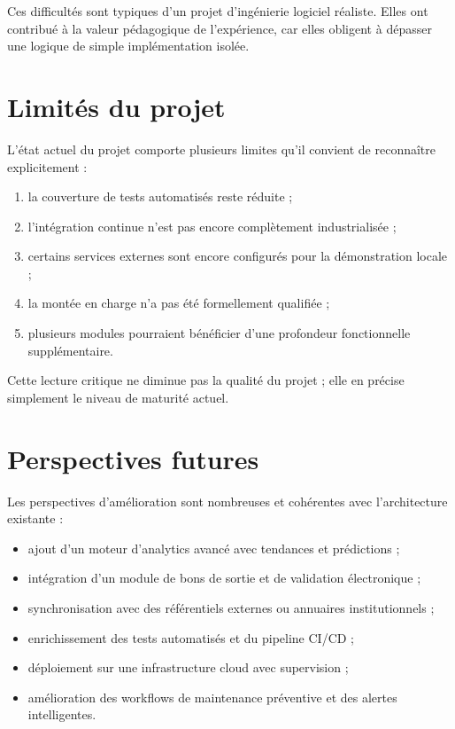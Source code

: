 Ces difficultés sont typiques d'un projet d'ingénierie logiciel réaliste. Elles ont contribué à la valeur pédagogique de l'expérience, car elles obligent à dépasser une logique de simple implémentation isolée.

\section{Limités du projet}
L'état actuel du projet comporte plusieurs limites qu'il convient de reconnaître explicitement :
\begin{enumerate}
  \item la couverture de tests automatisés reste réduite ;
  \item l'intégration continue n'est pas encore complètement industrialisée ;
  \item certains services externes sont encore configurés pour la démonstration locale ;
  \item la montée en charge n'a pas été formellement qualifiée ;
  \item plusieurs modules pourraient bénéficier d'une profondeur fonctionnelle supplémentaire.
\end{enumerate}

Cette lecture critique ne diminue pas la qualité du projet ; elle en précise simplement le niveau de maturité actuel.

\section{Perspectives futures}
Les perspectives d'amélioration sont nombreuses et cohérentes avec l'architecture existante :
\begin{itemize}
  \item ajout d'un moteur d'analytics avancé avec tendances et prédictions ;
  \item intégration d'un module de bons de sortie et de validation électronique ;
  \item synchronisation avec des référentiels externes ou annuaires institutionnels ;
  \item enrichissement des tests automatisés et du pipeline CI/CD ;
  \item déploiement sur une infrastructure cloud avec supervision ;
  \item amélioration des workflows de maintenance préventive et des alertes intelligentes.
\end{itemize}

